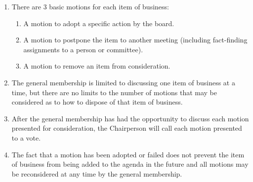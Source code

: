 \documentclass[12pt,a4paper]{article}
\begin{document}
\begin{enumerate}
\item There are 3 basic motions for each item of business:

\begin{enumerate}
\item A motion to adopt a specific action by the board.

\item A motion to postpone the item to another meeting (including fact-finding assignments to a person or committee).

\item A motion to remove an item from consideration.
\end{enumerate}

\item The general membership is limited to discussing one item of business at a time, but there are no limits to the number of motions that may be considered as to how to dispose of that item of business.

\item After the general membership has had the opportunity to discuss each motion presented for consideration, the Chairperson will call each motion presented to a vote.

\item The fact that a motion has been adopted or failed does not prevent the item of business from being added to the agenda in the future and all motions may be reconsidered at any time by the general membership.
\end{enumerate}
\end{document}
